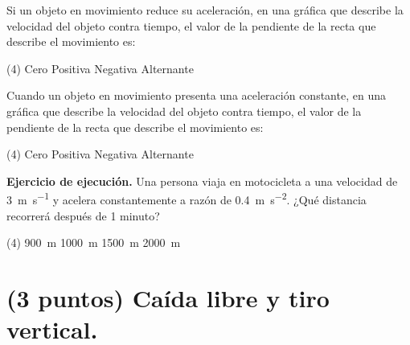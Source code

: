 \documentclass[12pt, letter]{exam}
\begin{document}
\begin{questions}
    \question Si un objeto en movimiento reduce su aceleración, en una gráfica que describe la velocidad del objeto contra tiempo, el valor de la pendiente de la recta que describe el movimiento es:
    \begin{tasks}(4)
        \task Cero
        \task Positiva
        \task Negativa
        \task Alternante
    \end{tasks}
    \question Cuando un objeto en movimiento presenta una aceleración constante, en una gráfica que describe la velocidad del objeto contra tiempo, el valor de la pendiente de la recta que describe el movimiento es:
    \begin{tasks}(4)
        \task Cero
        \task Positiva
        \task Negativa
        \task Alternante
    \end{tasks}
    \question \label{Ejercicio_04} \textbf{Ejercicio de ejecución. } Una persona viaja en motocicleta a una velocidad de \SI{3}{\meter\per\second} y acelera constantemente a razón de \SI{0.4}{\meter\per\square\second}. ¿Qué distancia recorrerá después de 1 minuto?
    \begin{tasks}(4)
        \task \SI{900}{\meter}
        \task \SI{1000}{\meter}
        \task \SI{1500}{\meter}
        \task \SI{2000}{\meter}
    \end{tasks}
    
    \section{(3 puntos) Caída libre y tiro vertical.}
    

\end{questions}
\end{document}
